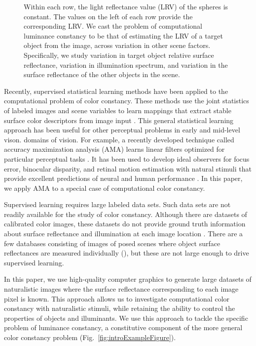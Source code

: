 \documentclass{jov}
\begin{document}
\begin{figure}
{Within each row, the light reflectance value (LRV) of the spheres is constant. The values on the left of each row provide the corresponding LRV. We cast the problem of computational luminance constancy to be that of estimating the LRV of a target object from the image, across variation in other scene factors. Specifically, we study variation in target object relative surface reflectance, variation in illumination spectrum, and variation in the surface reflectance of the other objects in the scene.}
 \end{figure}

Recently, supervised statistical learning methods have been applied to the computational problem of color constancy.
These methods use the joint statistics of labeled images and scene variables to learn mappings that extract stable surface color descriptors from image input \cite{barron2015convolutional}.
This general statistical learning approach has been useful for other perceptual problems in early and mid-level vison. domains of vision. 
For example, a recently developed technique called accuracy maximization analysis (AMA) learns linear filters optimized for particular perceptual tasks \cite{geisler2009optimal}. It has been used to develop ideal observers for focus error, binocular disparity, and retinal motion estimation with natural stimuli that provide excellent predictions of neural and human performance \cite{burge2011optimal, burge2012optimal, burge2014optimal, burge2015optimal}.
In this paper, we apply AMA to a special case of computational color constancy. 


Supervised learning requires large labeled data sets.  Such data sets are not readily available for the study of color constancy. Although there are datasets of calibrated color images, these datasets do not provide ground truth information about surface reflectance and illumination at each image location \cite{ChakrabartiHyperspectral,NascimentoFoster2016,ParragaHyperspectralData,TkacikUpennHypersepctralData,skauli2013collection,olmos2004biologically}. There are a few databases consisting of images of posed scenes where object surface reflectances are measured individually (), but these are not large enough to drive supervised learning.
 
In this paper, we use high-quality computer graphics to generate large datasets of naturalistic images where the surface reflectance corresponding to each image pixel is known. 
This approach allows us to investigate computational color constancy with naturalistic stimuli, while retaining the ability to control the properties of objects and illuminants. We use this approach to tackle the specific problem of luminance constancy, a constitutive component of the more general color constancy problem (Fig.~\ref{fig:introExampleFigure}). 
\end{document}
